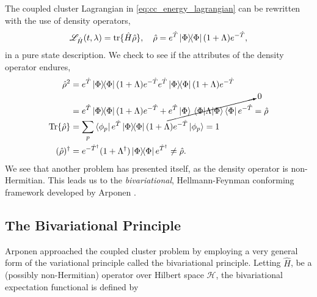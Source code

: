 The coupled cluster Lagrangian in \autoref{eq:cc_energy_lagrangian} can be rewritten 
with the use of density operators,
\begin{equation}
    \mathscr{L}_{\hat{H}}(t, \lambda) = \tr\{\hat{H}\hat{\rho}\}, \quad
    \hat{\rho} = e^{\hat{T}}\outerproduct{\Phi}(1 + \Lambda)e^{-\hat{T}},
\end{equation}
in a pure state description. We check to see if the attributes of the density operator 
endures,
\begin{align*}
    \hat{\rho}^2 &= 
        e^{\hat{T}}\outerproduct{\Phi}(1 + \Lambda)e^{-\hat{T}}
        e^{\hat{T}}\outerproduct{\Phi}(1 + \Lambda)e^{-\hat{T}} \\
        &= 
        e^{\hat{T}}\outerproduct{\Phi}(1 + \Lambda)e^{-\hat{T}}
        + \cancelto{0}{e^{\hat{T}}\ket{\Phi}
        \mel{\Phi}{\Lambda}{\Phi}
        \bra{\Phi}e^{-\hat{T}}} 
        = \hat{\rho} \\
    \Tr{\hat{\rho}} &= \sum_{p} \bra{\phi_p}e^{\hat{T}}\outerproduct{\Phi}(1 + \Lambda)e^{-\hat{T}} \ket{\phi_p}
    = 1 \\
    (\hat{\rho})^\dagger &= e^{-\hat{T}^\dagger}(1 + \Lambda^\dagger)
    \dyad{\Phi}e^{\hat{T}^\dagger} \neq \hat{\rho}.
\end{align*}
We see that another problem has 
presented itself, as the density operator is non-Hermitian. This leads us to the 
\emph{bivariational},
Hellmann-Feynman conforming framework developed by 
Arponen \cite{arponen1983variational}.


\subsection{The Bivariational Principle}

Arponen approached the coupled cluster problem by employing a very general form 
of the variational principle called the bivariational principle. Letting $\hat{H}$,
be a (possibly non-Hermitian) operator over Hilbert space $\mathcal{H}$, the bivariational 
expectation functional is defined by 


